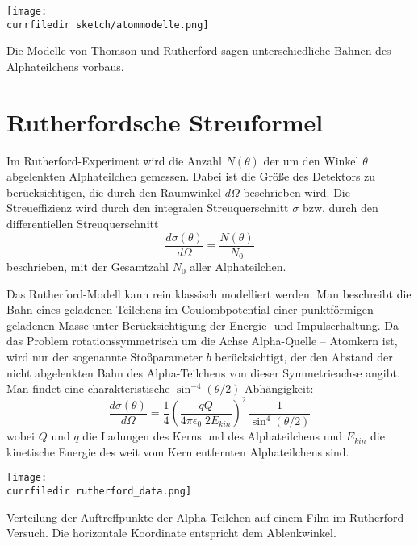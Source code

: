 \begin{marginfigure}
    \texttt{[image: \\currfiledir  sketch/atommodelle.png]}
    \caption{Die Modelle von Thomson und  Rutherford sagen unterschiedliche Bahnen des  Alphateilchens vorbaus.}
\end{marginfigure}

\section{Rutherfordsche Streuformel}

Im Rutherford-Experiment wird die Anzahl $N(\theta)$ der um den Winkel $\theta$ abgelenkten Alphateilchen gemessen. Dabei ist die Größe des Detektors zu berücksichtigen, die durch den Raumwinkel $d\Omega$ beschrieben wird. Die Streueffizienz wird durch den integralen Streuquerschnitt $\sigma$ bzw. durch den differentiellen Streuquerschnitt  
\begin{equation}
    \frac{d \sigma(\theta)}{d\Omega} = \frac{N(\theta)}{N_0}
\end{equation}
beschrieben, mit der Gesamtzahl $N_0$ aller Alphateilchen.




Das Rutherford-Modell kann rein klassisch modelliert werden. Man beschreibt die Bahn eines geladenen Teilchens im Coulombpotential einer punktförmigen geladenen Masse unter Berücksichtigung der Energie- und Impulserhaltung. Da das Problem rotationssymmetrisch um die Achse Alpha-Quelle -- Atomkern ist, wird nur der sogenannte Stoßparameter $b$ berücksichtigt, der den Abstand der nicht abgelenkten Bahn des Alpha-Teilchens von dieser Symmetrieachse angibt. Man findet  eine charakteristische $\sin^{-4} (\theta/2)$-Abhängigkeit:
\begin{equation}
    \frac{d \sigma(\theta)}{d\Omega} =
    \frac{1}{4} \left(
\frac{qQ}{4 \pi \epsilon_0 \; 2 E_{kin}}
    \right)^2 \, \frac{1}{\sin^4 (\theta/2)}
\end{equation}
wobei $Q$ und $q$ die Ladungen des Kerns und des Alphateilchens und $E_{kin}$ die kinetische Energie des weit vom Kern entfernten Alphateilchens sind.

\begin{marginfigure}
    \texttt{[image: \\currfiledir rutherford\_data.png]}
    \caption{Verteilung der Auftreffpunkte der Alpha-Teilchen auf einem Film im Rutherford-Versuch. Die horizontale Koordinate entspricht dem Ablenkwinkel.}
\end{marginfigure}


